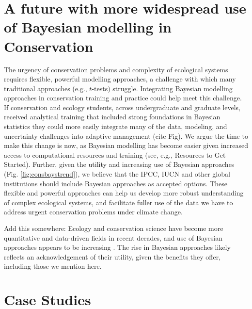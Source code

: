 \documentclass{article}
\begin{document}
\section* {A future with more widespread use of Bayesian modelling in Conservation}
\par The urgency of conservation problems and complexity of  ecological systems requires flexible, powerful modelling approaches, a challenge with which many traditional approaches (e.g., $t$-tests) struggle. Integrating Bayesian modelling approaches in conservation training and practice could help meet this challenge. If conservation and ecology students, across undergraduate and graduate levels, received analytical training that included strong foundations in Bayesian statistics they could more easily integrate many of the data, modeling, and uncertainty challenges into adaptive management (cite Fig). We argue the time to make this change is now, as Bayesian modelling has become easier given increased access to computational resources and training (see, e.g., Resources to Get Started). Further, given the utility and increasing use of Bayesian approaches (Fig. \ref{fig:consbaystrend}), we believe that the IPCC, IUCN and other global institutions should include Bayesian approaches as accepted options. These flexible and powerful approaches can help us develop more robust understanding of complex ecological systems, and facilitate fuller use of the data we have to address urgent conservation problems under climate change.

\par Add this somewhere:
Ecology and conservation science have become more quantitative and data-driven fields in recent decades, and use of Bayesian approaches appears to be increasing \citep{anderson2021trends}. The rise in Bayesian approaches likely reflects an acknowledgement of their utility, given the benefits they offer, including those we mention here. 



\section* {Case Studies}
\end{document}
